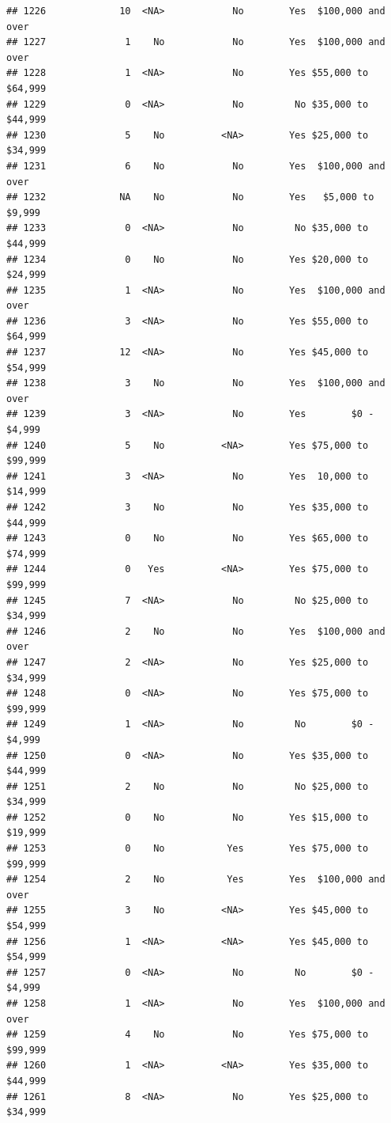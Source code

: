 \documentclass[man]{apa6}
\begin{document}
\begin{verbatim}
## 1226             10  <NA>            No        Yes  $100,000 and over
## 1227              1    No            No        Yes  $100,000 and over
## 1228              1  <NA>            No        Yes $55,000 to $64,999
## 1229              0  <NA>            No         No $35,000 to $44,999
## 1230              5    No          <NA>        Yes $25,000 to $34,999
## 1231              6    No            No        Yes  $100,000 and over
## 1232             NA    No            No        Yes   $5,000 to $9,999
## 1233              0  <NA>            No         No $35,000 to $44,999
## 1234              0    No            No        Yes $20,000 to $24,999
## 1235              1  <NA>            No        Yes  $100,000 and over
## 1236              3  <NA>            No        Yes $55,000 to $64,999
## 1237             12  <NA>            No        Yes $45,000 to $54,999
## 1238              3    No            No        Yes  $100,000 and over
## 1239              3  <NA>            No        Yes        $0 - $4,999
## 1240              5    No          <NA>        Yes $75,000 to $99,999
## 1241              3  <NA>            No        Yes  10,000 to $14,999
## 1242              3    No            No        Yes $35,000 to $44,999
## 1243              0    No            No        Yes $65,000 to $74,999
## 1244              0   Yes          <NA>        Yes $75,000 to $99,999
## 1245              7  <NA>            No         No $25,000 to $34,999
## 1246              2    No            No        Yes  $100,000 and over
## 1247              2  <NA>            No        Yes $25,000 to $34,999
## 1248              0  <NA>            No        Yes $75,000 to $99,999
## 1249              1  <NA>            No         No        $0 - $4,999
## 1250              0  <NA>            No        Yes $35,000 to $44,999
## 1251              2    No            No         No $25,000 to $34,999
## 1252              0    No            No        Yes $15,000 to $19,999
## 1253              0    No           Yes        Yes $75,000 to $99,999
## 1254              2    No           Yes        Yes  $100,000 and over
## 1255              3    No          <NA>        Yes $45,000 to $54,999
## 1256              1  <NA>          <NA>        Yes $45,000 to $54,999
## 1257              0  <NA>            No         No        $0 - $4,999
## 1258              1  <NA>            No        Yes  $100,000 and over
## 1259              4    No            No        Yes $75,000 to $99,999
## 1260              1  <NA>          <NA>        Yes $35,000 to $44,999
## 1261              8  <NA>            No        Yes $25,000 to $34,999

\end{verbatim}
\end{document}
